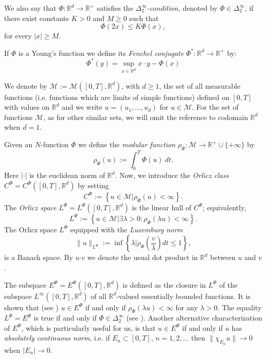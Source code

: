 \documentclass[twoside]{article}
\theoremstyle{remark}
\newcommand{\orlnor}{\|_{L^{\Phi}}}
\newcommand{\lphi}{L^{\Phi}}
\newcommand{\ephi}{E^{\Phi}}
\newcommand{\claseor}{C^{\Phi}}
\renewcommand{\b}[1]{\boldsymbol{#1}}
\newcommand{\rr}{\mathbb{R}}
\renewcommand{\leq}{\leqslant}
\renewcommand{\geq}{\geqslant}
\begin{document}
We also say that $\Phi:\mathbb{R}^d\rightarrow \mathbb{R}^+$ satisfies the  \emph{$\Delta_2^{\infty}$-condition}, denoted by $\Phi \in \Delta_2^{\infty}$,
if there exist  constants $K>0$ and  $M\geq 0$ such that
\begin{equation}\label{delta2defi}\Phi(2x)\leq K \Phi(x),
\end{equation}
for every $|x|\geq M$.

If $\Phi$ is a Young's function we define its \emph{Fenchel conjugate}   $\Phi^*:\mathbb{R}^d\to \mathbb{R}^+ $ by:
\begin{equation}\label{eq:conjugada}
 \Phi^*(y)=\sup\limits_{x\in\mathbb{R}^d} x\cdot y-\Phi(x)
\end{equation}


 We denote by $\mathcal{M}:=\mathcal{M}([0,T],\rr^d)$, with $d\geq 1$,  the set of all measurable functions (i.e. functions which are limits of simple functions)  defined on $[0,T]$ with values on $\mathbb{R}^d$ and  we write $u=(u_1,\dots,u_d)$ for  $u\in \mathcal{M}$. For the set of functions $\mathcal{M}$, as for other similar sets, we will omit the reference to codomain $\mathbb{R}^d$ when $d=1$.


Given  an $N$-function $\Phi$ we define the \emph{modular function} 
$\rho_{\Phi}:\mathcal{M}\to \mathbb{R}^+\cup\{+\infty\}$ by
\[\rho_{\Phi}(u):= \int_0^T \Phi(u)\ dt.\]
Here $|\cdot|$ is the euclidean norm of $\mathbb{R}^d$.
Now, we introduce the \emph{Orlicz class} $C^{\Phi}=C^{\Phi}([0,T],\rr^d)$   by setting
\begin{equation}\label{claseOrlicz}
  C^{\Phi}:=\left\{u\in \mathcal{M} | \rho_{\Phi}(u)< \infty \right\}.
\end{equation}
The \emph{Orlicz space} $\lphi=L^{\Phi}([0,T],\rr^d)$ is the linear hull of $\claseor$;
equivalently,
\begin{equation}\label{espacioOrlicz}
\lphi:=\left\{ u\in \mathcal{M}| \exists \lambda>0: \rho_{\Phi}(\lambda u) < \infty   \right\}.
\end{equation}
  The Orlicz space $\lphi$ equipped with the \emph{Luxemburg norm}
\[
\|  u  \orlnor:=\inf \left\{ \lambda\bigg| \rho_{\Phi}\left(\frac{v}{\lambda}\right) dt\leq 1\right\},
\]
is a Banach space. By $u\b{\cdot} v$ we denote the usual dot product in $\mathbb{R}^{d}$ between $u$ and $v$.


The subspace $\ephi=\ephi([0,T],\rr^d)$ is defined as the closure in $\lphi$ of the subspace $L^{\infty}([0,T],\rr^d)$ of all $\mathbb{R}^d$-valued essentially bounded functions. It is shown that  (see \cite[Thm. 5.1]{Orliczvectorial2005}) $u\in\ephi$  if and only if $\rho_{\Phi}(\lambda u)<\infty$ for any $\lambda>0$. The equality $\lphi=\ephi$ is true if and only if $\Phi\in\Delta_2^{\infty}$ (see \cite[Thm. 5.2]{Orliczvectorial2005}). Another alternative characterization of $\ephi$, which is particularly useful for us, is that $u\in\ephi$ if and only if $u$ has  \emph{absolutely continuous norm}, i.e.   if $E_n\subset [0,T]$, $n=1,2,\ldots$ then $\|\chi_{E_n}u\|\to 0$ when $|E_n|\to 0$.
\end{document}

